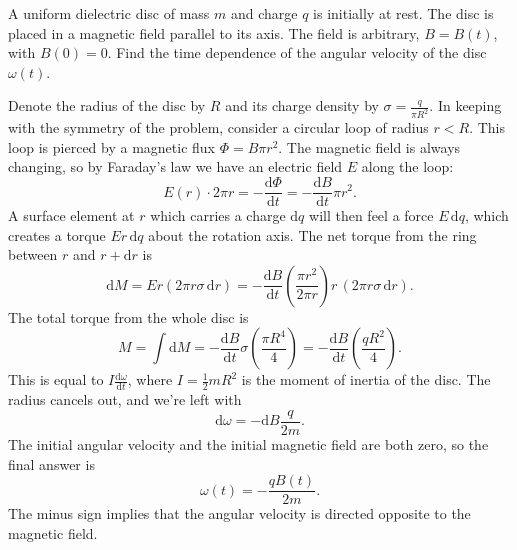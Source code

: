\documentclass[../TST.tex]{subfiles}
\begin{document}
\begin{pproblem}
A uniform dielectric disc of mass $m$ and charge $q$ is initially at rest. The disc is placed in a magnetic field parallel to its axis. The field is arbitrary, $B=B(t)$, with $B(0)=0$. Find the time dependence of the angular velocity of the disc $\omega(t)$.
\end{pproblem}

\ifprob \else
\begin{solution} Denote the radius of the disc by $R$ and its charge density by $\sigma=\frac{q}{\pi R^2}$. In keeping with the symmetry of the problem, consider a circular loop of radius $r<R$. This loop is pierced by a magnetic flux $\Phi=B\pi r^2$. The magnetic field is always changing, so by Faraday's law we have an electric field $E$ along the loop:
	\begin{equation*}
	E(r)\cdot 2\pi r = - \frac{\mathrm{d}\Phi}{\mathrm{d}t} = -\frac{\mathrm{d}B}{\mathrm{d}t}\pi r^2
	.
	\end{equation*}
A surface element at $r$ which carries a charge $\mathrm{d}q$ will then feel a force $E\,\mathrm{d}q$, which creates a torque $E r\,\mathrm{d}q$ about the rotation axis. The net torque from the ring between $r$ and $r+\mathrm{d}r$ is 
\begin{equation*}
\mathrm{d}M=Er( 2\pi r\sigma\,\mathrm{d}r)= -\frac{\mathrm{d}B}{\mathrm{d}t}\left(\frac{\pi r^2}{2\pi r}\right)r\,(2\pi r\sigma\,\mathrm{d}r).
\end{equation*}
The total torque from the whole disc is
\begin{equation*}
M = \int \mathrm{d}M = -\frac{\mathrm{d}B}{\mathrm{d}t}\sigma \left(\frac{\pi R^4}{4}\right) = -\frac{\mathrm{d}B}{\mathrm{d}t}\left(\frac{qR^2}{4}\right) 
.
\end{equation*}
This is equal to $I \frac{\mathrm{d}\omega}{\mathrm{d}t}$, where $I=\frac{1}{2}mR^2$ is the moment of inertia of the disc. The radius cancels out, and we're left with
\begin{equation*}
\mathrm{d}\omega = -\mathrm{d}B \frac{q}{2m}
.
\end{equation*}
The initial angular velocity and the initial magnetic field are both zero, so the final answer is 
\begin{equation*}
\boxed{\omega(t) = -\frac{qB(t)}{2m} .}
\end{equation*}
The minus sign implies that the angular velocity is directed opposite to the magnetic field.
\end{solution}
\fi
\end{document}
